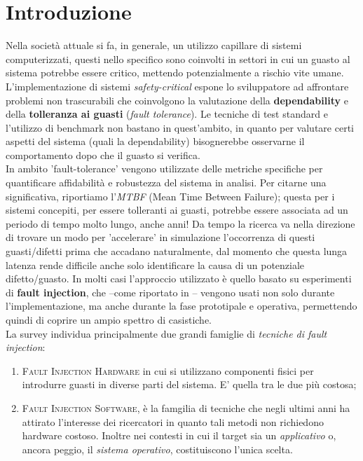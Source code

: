 \section{Introduzione}
Nella società attuale si fa, in generale, un utilizzo capillare di sistemi computerizzati, questi nello specifico sono coinvolti in settori in cui un guasto al sistema potrebbe essere critico, mettendo potenzialmente a rischio vite umane. L'implementazione di sistemi \textit{safety-critical} espone lo sviluppatore ad affrontare problemi non trascurabili che coinvolgono la valutazione della \textbf{dependability} e della \textbf{tolleranza ai guasti} (\textit{fault tolerance}). Le tecniche di test standard e l'utilizzo di benchmark non bastano in quest'ambito, in quanto per valutare certi aspetti del sistema (quali la dependability) bisognerebbe osservarne il comportamento dopo che il guasto si verifica. \\
In ambito 'fault-tolerance' vengono utilizzate delle metriche specifiche per quantificare affidabilità e robustezza del sistema in analisi. Per citarne una significativa, riportiamo l'\textit{MTBF} (Mean Time Between Failure); questa per i sistemi concepiti, per essere tolleranti ai guasti, potrebbe essere associata ad un periodo di tempo molto lungo, anche anni! Da tempo la ricerca va nella direzione di trovare un modo per 'accelerare' in simulazione l'occorrenza di questi guasti/difetti prima che accadano naturalmente, dal momento che questa lunga latenza rende difficile anche solo identificare la causa di un potenziale difetto/guasto. In molti casi l'approccio utilizzato è quello basato su esperimenti di \textbf{fault injection}, che --come riportato in \cite{depend} -- vengono usati non solo durante l'implementazione, ma anche durante la fase prototipale e operativa, permettendo quindi di coprire un ampio spettro di casistiche.\\
La survey \cite{hsueh1997fault} individua principalmente due grandi famiglie di \textit{tecniche di fault injection}:
\begin{enumerate}
    \itemsep-0.2em
    \item \textsc{Fault Injection Hardware} in cui si utilizzano componenti fisici per introdurre guasti in diverse parti del sistema. E' quella tra le due più costosa;
    \item \textsc{Fault Injection Software}, è la famgilia  di tecniche che negli ultimi anni ha attirato l'interesse dei ricercatori in quanto tali metodi non richiedono hardware costoso. Inoltre nei contesti in cui il target sia un \textit{applicativo} o, ancora peggio, il \textit{sistema operativo}, costituiscono l'unica scelta.
\end{enumerate}

